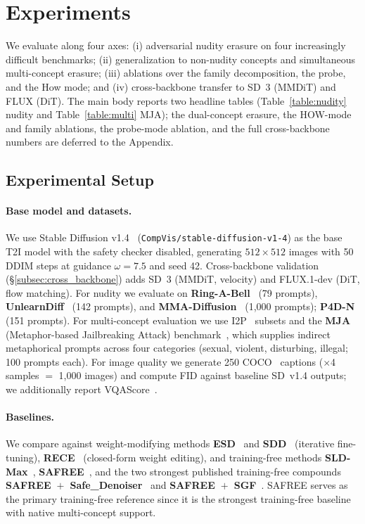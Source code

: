 \section{Experiments}
\label{sec:exp}

We evaluate \ours{} along four axes: (i) adversarial nudity erasure on four increasingly difficult benchmarks; (ii) generalization to non-nudity concepts and simultaneous multi-concept erasure; (iii) ablations over the family decomposition, the probe, and the How mode; and (iv) cross-backbone transfer to SD~3 (MMDiT) and FLUX (DiT). The main body reports two headline tables (Table~\ref{table:nudity} nudity and Table~\ref{table:multi} MJA); the dual-concept erasure, the HOW-mode and family ablations, the probe-mode ablation, and the full cross-backbone numbers are deferred to the Appendix.

\subsection{Experimental Setup}
\label{subsec:setup}

\paragraph{Base model and datasets.} We use Stable Diffusion v1.4~\citep{rombach2022high} (\texttt{CompVis/stable-diffusion-v1-4}) as the base T2I model with the safety checker disabled, generating $512{\times}512$ images with 50 DDIM steps at guidance $\omega{=}7.5$ and seed 42. Cross-backbone validation (\S\ref{subsec:cross_backbone}) adds SD~3 (MMDiT, velocity) and FLUX.1-dev (DiT, flow matching). For nudity we evaluate on \textbf{Ring-A-Bell}~\citep{tsai2023ring} (79 prompts), \textbf{UnlearnDiff}~\citep{zhang2024generate} (142 prompts), and \textbf{MMA-Diffusion}~\citep{yang2024mma} (1{,}000 prompts); \textbf{P4D-N}~\citep{chin2023prompting4debugging} (151 prompts). For multi-concept evaluation we use I2P~\citep{schramowski2023safe} subsets and the \textbf{MJA} (Metaphor-based Jailbreaking Attack) benchmark~\citep{zhang2026reason2attack}, which supplies indirect metaphorical prompts across four categories (sexual, violent, disturbing, illegal; 100 prompts each). For image quality we generate 250 COCO~\citep{lin2014microsoft} captions ($\times$4 samples $=$ 1{,}000 images) and compute FID against baseline SD~v1.4 outputs; we additionally report VQAScore~\citep{lin2024evaluating}.

\paragraph{Baselines.} We compare against weight-modifying methods \textbf{ESD}~\citep{gandikota2023erasing} and \textbf{SDD}~\citep{kim2023towards} (iterative fine-tuning), \textbf{RECE}~\citep{gong2024reliable} (closed-form weight editing), and training-free methods \textbf{SLD-Max}~\citep{schramowski2023safe}, \textbf{SAFREE}~\citep{yoon2024safree}, and the two strongest published training-free compounds \textbf{SAFREE~$+$~Safe\_Denoiser}~\citep{kim2025training} and \textbf{SAFREE~$+$~SGF}~\citep{kim2026safety}. SAFREE serves as the primary training-free reference since it is the strongest training-free baseline with native multi-concept support.

